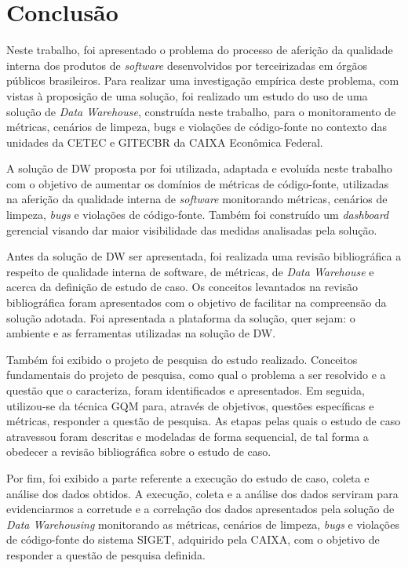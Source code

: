 \chapter{Conclusão}

Neste trabalho, foi apresentado o problema do processo de aferição da qualidade interna dos produtos de \textit{software} desenvolvidos por terceirizadas em órgãos públicos brasileiros. Para realizar uma investigação empírica deste problema, com vistas à proposição de uma solução, foi realizado um estudo do uso de uma solução de \textit{Data Warehouse}, construída neste trabalho, para o monitoramento de métricas, cenários de limpeza, bugs e violações de código-fonte no contexto das unidades da  CETEC e GITECBR da CAIXA Econômica Federal.

A solução de DW proposta por  foi utilizada, adaptada e evoluída neste trabalho com o objetivo de aumentar os domínios de métricas de código-fonte, utilizadas na aferição da qualidade interna de \textit{software} monitorando métricas, cenários de limpeza, \textit{bugs} e violações de código-fonte. Também foi construído um \textit{dashboard} gerencial visando dar maior visibilidade das medidas analisadas pela solução.

Antes da solução de DW ser apresentada, foi realizada uma revisão bibliográfica a respeito de qualidade interna de software, de métricas, de \textit{Data Warehouse} e acerca da definição de estudo de caso. Os conceitos levantados na revisão bibliográfica foram apresentados com o objetivo de facilitar na compreensão da solução adotada. Foi apresentada a plataforma da solução, quer sejam: o ambiente e as ferramentas utilizadas na solução de DW. 

Também foi exibido o projeto de pesquisa do estudo realizado. Conceitos fundamentais do projeto de pesquisa, como qual o problema a ser resolvido e a questão que o caracteriza, foram identificados e apresentados. Em seguida, utilizou-se da  técnica GQM para, através de objetivos, questões específicas e métricas, responder a questão de pesquisa. As etapas pelas quais o estudo de caso atravessou foram descritas e modeladas de forma sequencial, de tal forma a obedecer a revisão bibliográfica sobre o estudo de caso.

Por fim, foi exibido a parte referente a execução do estudo de caso, coleta e análise dos dados obtidos. A execução, coleta e a análise dos dados serviram para evidenciarmos a corretude e a correlação dos dados apresentados pela solução de \textit{Data Warehousing} monitorando as métricas, cenários de limpeza, \textit{bugs} e violações de código-fonte do sistema SIGET, adquirido pela CAIXA, com o objetivo de responder a questão de pesquisa definida.

